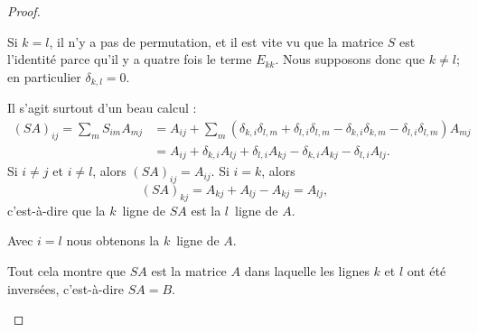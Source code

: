 \begin{proof}
\begin{subproof}
		\spitem[\ref{ITEMooDNHWooOMgmxa}]
		Si \( k=l\), il n'y a pas de permutation, et il est vite vu que la matrice \( S\) est l'identité parce qu'il y a quatre fois le terme \( E_{kk}\). Nous supposons donc que \( k\neq l\); en particulier \( \delta_{k,l}=0\).

		Il s'agit surtout d'un beau calcul :
		\begin{subequations}
			\begin{align}
				(SA)_{ij}=\sum_{m}S_{im}A_{mj} & =A_{ij}+\sum_m(\delta_{k,i}\delta_{l,m}+\delta_{l,i}\delta_{l,m}-\delta_{k,i}\delta_{k,m}-\delta_{l,i}\delta_{l,m})A_{mj} \\
				                               & =A_{ij}+\delta_{k,i}A_{lj}+\delta_{l,i}A_{kj}-\delta_{k,i}A_{kj}-\delta_{l,i}A_{lj}.
			\end{align}
		\end{subequations}
		Si \( i\neq j\) et \( i\neq l\), alors \( (SA)_{ij}=A_{ij}\). Si \( i=k\), alors
		\begin{equation}
			(SA)_{kj}=A_{kj}+A_{lj}-A_{kj}=A_{lj},
		\end{equation}
		c'est-à-dire que la \( k\)\ieme\ ligne de \( SA\) est la \( l\)\ieme\ ligne de \( A\).

		Avec \( i=l\) nous obtenons la \( k\)\ieme\ ligne de \( A\).

		Tout cela montre que \( SA\) est la matrice \( A\) dans laquelle les lignes \( k\) et \( l\) ont été inversées, c'est-à-dire \( SA=B\).


\end{subproof}
\end{proof}
